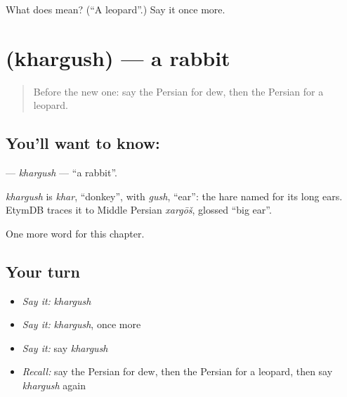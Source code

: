 \begin{tcolorbox}[breakable,colback=teal!4,colframe=teal!35!black,title={Before you move on}]
What does  mean? (\textquotedblleft{}A leopard\textquotedblright{}.) Say it once more.
\end{tcolorbox}
\section[\texorpdfstring{\fa{خرگوش} (khargush)}{خرگوش (khargush)}]{ (khargush) — a rabbit}

\label{lesson:FA-C105-khargush}



\begin{quote}
Before the new one: say the Persian for dew, then the Persian for a leopard.
\end{quote}

\subsection*{You'll want to know: }
\textbf{} — \emph{khargush} — \textquotedblleft{}a rabbit\textquotedblright{}.

\begin{cousinweb}
\emph{khargush} is \emph{khar}, \textquotedblleft{}donkey\textquotedblright{}, with \emph{gush}, \textquotedblleft{}ear\textquotedblright{}: the hare named for its long ears. EtymDB traces it to Middle Persian \emph{xargōš}, glossed \textquotedblleft{}big ear\textquotedblright{}.
\end{cousinweb}

\begin{grammarlens}[title={What you've built}]
One more word for this chapter.
\end{grammarlens}

\subsection*{Your turn}
\begin{itemize}
\raggedright
  \item \emph{Say it:} \emph{khargush}
  \item \emph{Say it:} \emph{khargush}, once more
  \item \emph{Say it:} say \emph{khargush}
  \item \emph{Recall:} say the Persian for dew, then the Persian for a leopard, then say \emph{khargush} again
\end{itemize}

